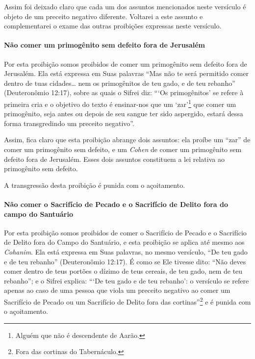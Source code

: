 Assim foi deixado claro que cada um dos assuntos mencionados neste
versículo é objeto de um preceito negativo diferente. Voltarei a este
assunto e complementarei o exame das outras proibições expressas neste
versículo.

\paragraph{Não comer um primogênito sem defeito fora de Jerusalém}

Por esta proibição somos proibidos de comer um primogênito sem defeito
fora de Jerusalém. Ela está expressa em Suas palavras ``Mas não te será
permitido comer dentro de tuas cidades\ldots{} nem os primogênitos de teu
gado, e de teu rebanho'' (Deuteronômio 12:17), sobre as quais o Sifrei
diz: ```Os primogênitos' se refere à primeira cria e o objetivo do
texto é ensinar-nos que um `zar'\footnote{Alguém que não é descendente de Aarão.} que comer um primogênito, seja antes ou depois de seu sangue ter sido aspergido,
estará dessa forma transgredindo um preceito negativo''.

Assim, fica claro que esta proibição abrange dois assuntos: ela proíbe
um ``zar'' de comer um primogênito sem defeito, e um \textit{Cohen} de comer
um primogênito sem defeito fora de Jerusalém. Esses dois assuntos
constituem a lei relativa ao primogênito sem defeito.

A transgressão desta proibição é punida com o açoitamento.

\paragraph{Não comer o Sacrifício de Pecado e o Sacrifício de Delito fora do campo do
Santuário}

Por esta proibição somos proibidos de comer o Sacrifício de Pecado e o
Sacrifício de Delito fora do Campo do Santuário, e esta proibição se
aplica até mesmo aos \textit{Cohanim}. Ela está expressa em Suas palavras, no
mesmo versículo, ``De teu gado e de teu rebanho'' (Deuteronômio 12:17).
É como se Ele
tivesse dito: ``Não deves comer dentro de teus portões o dízimo de teus
cereais, de teu gado, nem de teu rebanho''; e o Sifrei explica: ```De
teu gado e de teu rebanho': o versículo se refere apenas ao caso de uma
pessoa que viola um preceito negativo ao comer um Sacrifício de Pecado
ou um Sacrifício de Delito fora das cortinas''\footnote{Fora das cortinas do Tabernáculo.} e é
punida com o açoitamento.

